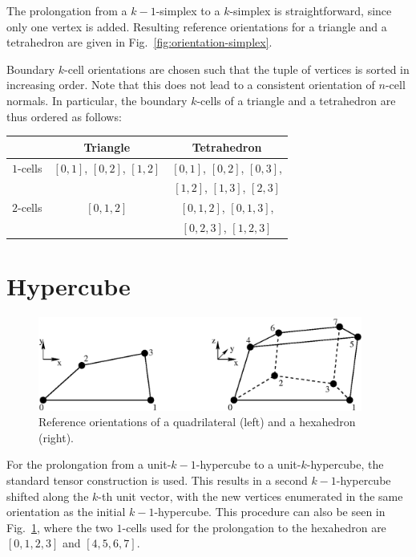 The prolongation from a $k-1$-simplex to a $k$-simplex is straightforward, since only one vertex is added.
Resulting reference orientations for a triangle and a tetrahedron are given in Fig.~\ref{fig:orientation-simplex}.

Boundary $k$-cell orientations are chosen such that the tuple of vertices is sorted in increasing order.
Note that this does not lead to a consistent orientation of $n$-cell normals. In particular,
the boundary $k$-cells of a triangle and a tetrahedron are thus ordered as follows:
\begin{center}
 \begin{tabular}{|l|c|c|}
  \hline
              & Triangle                  & Tetrahedron   \\
  \hline
   $1$-cells  & $[0,1]$, $[0,2]$, $[1,2]$ & $[0, 1]$, $[0, 2]$, $[0,3]$, \\
              &                           & $[1, 2]$, $[1, 3]$, $[2,3]$ \\
  \hline
   $2$-cells  & $[0,1,2]$                 & $[0,1,2]$, $[0,1,3]$, \\
              &                           & $[0,2,3]$, $[1,2,3]$ \\
  \hline
 \end{tabular}

\end{center}


\section{Hypercube}
\begin{figure}[tb]
\centering
 \includegraphics[width=0.95\textwidth]{figures/orientation-hypercube.eps}
 \caption{Reference orientations of a quadrilateral (left) and a hexahedron (right).}
 \label{fig:orientation-hypercube}
\end{figure}

For the prolongation from a unit-$k-1$-hypercube to a unit-$k$-hypercube, the standard tensor
construction is used. This results in a second $k-1$-hypercube shifted along the $k$-th unit vector,
with the new vertices enumerated in the same orientation as the initial $k-1$-hypercube.
This procedure can also be seen in Fig.~\ref{fig:orientation-hypercube}, where 
the two $1$-cells used for the prolongation to the hexahedron are $[0,1,2,3]$ and $[4,5,6,7]$.

